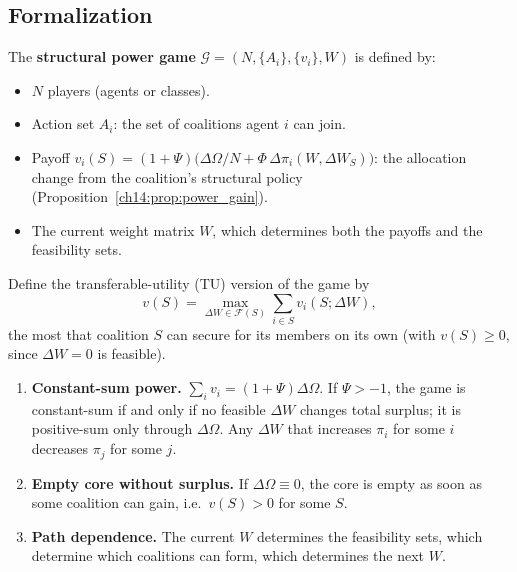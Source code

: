 \documentclass[../structural_economics_book.tex]{subfiles}
\begin{document}
\subsection{Formalization}

\begin{definition}\label{ch14:def:game}
The \textbf{structural power game} $\mathcal{G} = (N, \{A_i\}, \{v_i\}, W)$ is defined by:
\begin{itemize}
\item $N$ players (agents or classes).
\item Action set $A_i$: the set of coalitions agent $i$ can join.
\item Payoff $v_i(S) = (1+\Psi)\big(\Delta\Omega/N + \Phi\,\Delta\pi_i(W, \Delta W_S)\big)$: the allocation change from the coalition's structural policy (Proposition~\ref{ch14:prop:power_gain}).
\item The current weight matrix $W$, which determines both the payoffs and the feasibility sets.
\end{itemize}
\end{definition}

Define the transferable-utility (TU) version of the game by
\[
v(S) = \max_{\Delta W \in \mathcal{F}(S)} \sum_{i \in S} v_i(S; \Delta W),
\]
the most that coalition $S$ can secure for its members on its own (with $v(S) \geq 0$, since $\Delta W = 0$ is feasible).

\begin{proposition}\label{ch14:prop:game_properties}
\begin{enumerate}
\item \textbf{Constant-sum power.} $\sum_i v_i = (1+\Psi)\Delta\Omega$. If $\Psi > -1$, the game is constant-sum if and only if no feasible $\Delta W$ changes total surplus; it is positive-sum only through $\Delta\Omega$. Any $\Delta W$ that increases $\pi_i$ for some $i$ decreases $\pi_j$ for some $j$.
\item \textbf{Empty core without surplus.} If $\Delta\Omega \equiv 0$, the core is empty as soon as some coalition can gain, i.e.\ $v(S) > 0$ for some $S$.
\item \textbf{Path dependence.} The current $W$ determines the feasibility sets, which determine which coalitions can form, which determines the next $W$.
\end{enumerate}
\end{proposition}
\end{document}
